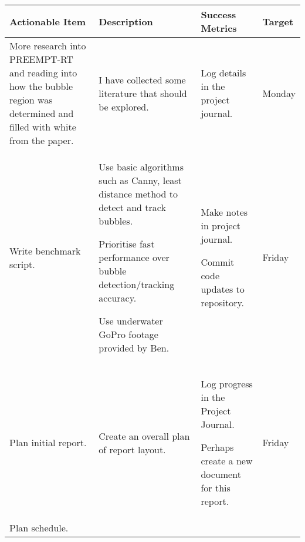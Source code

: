 \begin{table}[!h]
    \centering
    \begin{tabularx}{\textwidth}{|X|X|X|l|}
        \hline
        Actionable Item & Description & Success Metrics & Target \\
        \hline
        \hline
        More research into PREEMPT-RT and reading into how the bubble region was determined and filled with white from the paper. &
        \begin{myitemize}
            \item I have collected some literature that should be explored.
        \end{myitemize} &
        \begin{myitemize}
            \item Log details in the project journal.
        \end{myitemize} &
        Monday \\
        \hline
        Write benchmark script. &
        \begin{myitemize}
            \item Use basic algorithms such as Canny, least distance method to detect and track bubbles.
            \item Prioritise fast performance over bubble detection/tracking accuracy.
            \item Use underwater GoPro footage provided by Ben.
        \end{myitemize} &
        \begin{myitemize}
            \item Make notes in project journal.
            \item Commit code updates to repository.
        \end{myitemize} &
        Friday \\
        \hline
        Plan initial report. &
        \begin{myitemize}
            \item Create an overall plan of report layout.
        \end{myitemize} &
        \begin{myitemize}
            \item Log progress in the Project Journal.
            \item Perhaps create a new document for this report.
        \end{myitemize} &
        Friday \\
        \hline
        Plan schedule. &

\end{tabularx}
\end{table}
